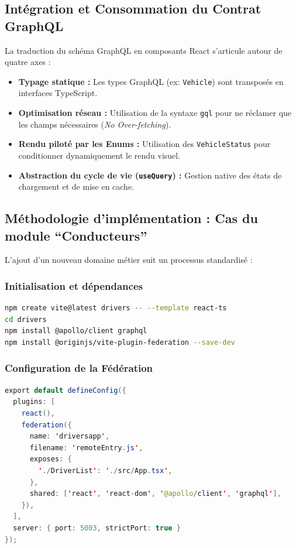 \documentclass[12pt,a4paper]{article}
\begin{document}
\subsection{Int\'{e}gration et Consommation du Contrat GraphQL}

La traduction du sch\'{e}ma GraphQL en composants React s'articule autour de quatre axes :
\begin{itemize}
  \item \textbf{Typage statique :} Les types GraphQL (ex: \texttt{Vehicle}) sont transpos\'{e}s en interfaces TypeScript.
  \item \textbf{Optimisation r\'{e}seau :} Utilisation de la syntaxe \texttt{gql} pour ne r\'{e}clamer que les champs n\'{e}cessaires (\textit{No Over-fetching}).
  \item \textbf{Rendu pilot\'{e} par les Enums :} Utilisation des \texttt{VehicleStatus} pour conditionner dynamiquement le rendu visuel.
  \item \textbf{Abstraction du cycle de vie (\texttt{useQuery}) :} Gestion native des \'{e}tats de chargement et de mise en cache.
\end{itemize}

\subsection{M\'{e}thodologie d'impl\'{e}mentation : Cas du module ``Conducteurs''}

L'ajout d'un nouveau domaine m\'{e}tier suit un processus standardis\'{e} :

\subsubsection{Initialisation et d\'{e}pendances}
\begin{lstlisting}[language=bash]
npm create vite@latest drivers -- --template react-ts
cd drivers
npm install @apollo/client graphql
npm install @originjs/vite-plugin-federation --save-dev
\end{lstlisting}

\subsubsection{Configuration de la F\'{e}d\'{e}ration}
\begin{lstlisting}[language=Java, caption=drivers/vite.config.ts (extraits)]
export default defineConfig({
  plugins: [
    react(),
    federation({
      name: 'driversapp',
      filename: 'remoteEntry.js',
      exposes: {
        './DriverList': './src/App.tsx',
      },
      shared: ['react', 'react-dom', '@apollo/client', 'graphql'],
    }),
  ],
  server: { port: 5003, strictPort: true }
});
\end{lstlisting}
\end{document}
